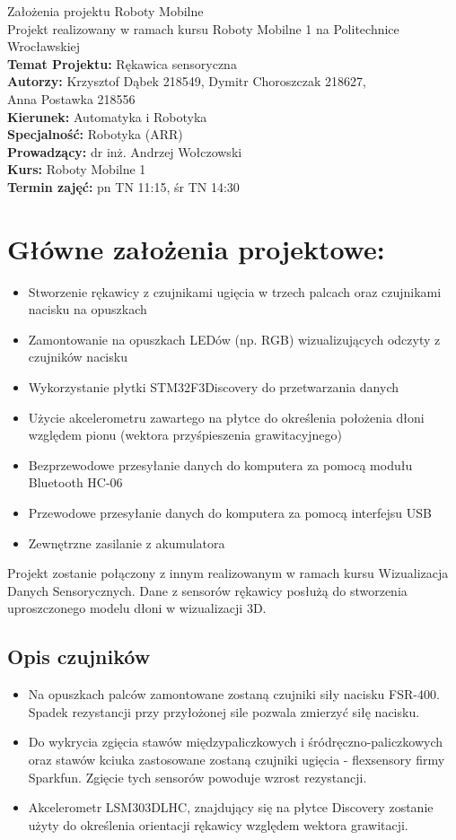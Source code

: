 \documentclass[12pt,a4paper]{article}
\begin{document}
\LARGE\centering Założenia projektu Roboty Mobilne\\
\large\centering Projekt realizowany w ramach kursu Roboty Mobilne 1 na Politechnice Wrocławskiej\\
\vspace{5 mm}
\normalsize\flushleft\textbf{Temat Projektu:} Rękawica sensoryczna\\
\textbf{Autorzy:} Krzysztof Dąbek 218549, Dymitr Choroszczak 218627,\\Anna Postawka 218556\\
\textbf{Kierunek:} Automatyka i Robotyka\\
\textbf{Specjalność:} Robotyka (ARR)\\
\textbf{Prowadzący:} dr inż. Andrzej Wołczowski\\
\textbf{Kurs:} Roboty Mobilne 1\\
\textbf{Termin zajęć:} pn TN 11:15, śr TN 14:30\\
\vspace{5 mm}
\section{Główne założenia projektowe: }\normalsize
\begin{itemize}
\item Stworzenie rękawicy z czujnikami ugięcia w trzech palcach oraz czujnikami nacisku na opuszkach
\item Zamontowanie na opuszkach LEDów (np. RGB) wizualizujących odczyty z czujników nacisku
\item Wykorzystanie płytki STM32F3Discovery do przetwarzania danych
\item Użycie akcelerometru zawartego na płytce do określenia położenia dłoni względem pionu (wektora przyśpieszenia grawitacyjnego)
\item Bezprzewodowe przesyłanie danych do komputera za pomocą modułu Bluetooth HC-06
\item Przewodowe przesyłanie danych do komputera za pomocą interfejsu USB
\item Zewnętrzne zasilanie z akumulatora
\end{itemize}
Projekt zostanie połączony z innym realizowanym w ramach kursu Wizualizacja Danych Sensorycznych. Dane z sensorów rękawicy posłużą do stworzenia uproszczonego modelu dłoni w wizualizacji 3D.
\subsection{Opis czujników}
\begin{itemize}
\item Na opuszkach palców zamontowane zostaną czujniki siły nacisku FSR-400. Spadek rezystancji przy przyłożonej sile pozwala zmierzyć siłę nacisku.
\item Do wykrycia zgięcia stawów międzypaliczkowych i śródręczno-paliczkowych oraz stawów kciuka zastosowane zostaną czujniki ugięcia - flexsensory firmy Sparkfun. Zgięcie tych sensorów powoduje wzrost rezystancji.
\item Akcelerometr LSM303DLHC, znajdujący się na płytce Discovery zostanie użyty do określenia orientacji rękawicy względem wektora grawitacji.
\end{itemize}
\end{document}
